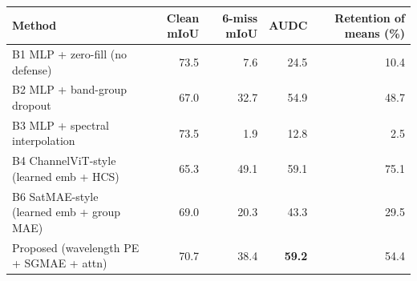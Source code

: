 \begin{tabular}{lrrrr}
\toprule
Method & Clean mIoU & 6-miss mIoU & AUDC & Retention of means (\%) \\
\midrule
B1 MLP + zero-fill (no defense) & 73.5 & 7.6 & 24.5 & 10.4 \\
B2 MLP + band-group dropout & 67.0 & 32.7 & 54.9 & 48.7 \\
B3 MLP + spectral interpolation & 73.5 & 1.9 & 12.8 & 2.5 \\
B4 ChannelViT-style (learned emb + HCS) & 65.3 & 49.1 & 59.1 & 75.1 \\
B6 SatMAE-style (learned emb + group MAE) & 69.0 & 20.3 & 43.3 & 29.5 \\
Proposed (wavelength PE + SGMAE + attn) & 70.7 & 38.4 & \textbf{59.2} & 54.4 \\
\bottomrule
\end{tabular}

